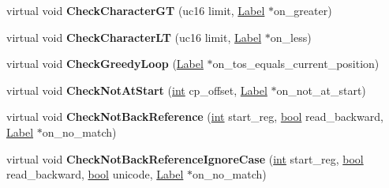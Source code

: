 \begin{DoxyCompactItemize}
\item 
\mbox{\label{classv8_1_1internal_1_1RegExpMacroAssemblerMIPS_a8125957e75e4d4149e916f9a2e1fb925}} 
virtual void {\bfseries Check\+Character\+GT} (uc16 limit, \mbox{\hyperlink{classv8_1_1internal_1_1Label}{Label}} $\ast$on\+\_\+greater)
\item 
\mbox{\label{classv8_1_1internal_1_1RegExpMacroAssemblerMIPS_aeb4a8f3d2314494596589c9b1543faef}} 
virtual void {\bfseries Check\+Character\+LT} (uc16 limit, \mbox{\hyperlink{classv8_1_1internal_1_1Label}{Label}} $\ast$on\+\_\+less)
\item 
\mbox{\label{classv8_1_1internal_1_1RegExpMacroAssemblerMIPS_ae3b5ebd2bfaefa19786e18e5103b2881}} 
virtual void {\bfseries Check\+Greedy\+Loop} (\mbox{\hyperlink{classv8_1_1internal_1_1Label}{Label}} $\ast$on\+\_\+tos\+\_\+equals\+\_\+current\+\_\+position)
\item 
\mbox{\label{classv8_1_1internal_1_1RegExpMacroAssemblerMIPS_aca545a4b5e0b1b8cf0cc2fd6778eb8f1}} 
virtual void {\bfseries Check\+Not\+At\+Start} (\mbox{\hyperlink{classint}{int}} cp\+\_\+offset, \mbox{\hyperlink{classv8_1_1internal_1_1Label}{Label}} $\ast$on\+\_\+not\+\_\+at\+\_\+start)
\item 
\mbox{\label{classv8_1_1internal_1_1RegExpMacroAssemblerMIPS_af33344a5d113a2f1318f2549554fdaca}} 
virtual void {\bfseries Check\+Not\+Back\+Reference} (\mbox{\hyperlink{classint}{int}} start\+\_\+reg, \mbox{\hyperlink{classbool}{bool}} read\+\_\+backward, \mbox{\hyperlink{classv8_1_1internal_1_1Label}{Label}} $\ast$on\+\_\+no\+\_\+match)
\item 
\mbox{\label{classv8_1_1internal_1_1RegExpMacroAssemblerMIPS_a797e74e54cda0b9368dbe36c8f9bb704}} 
virtual void {\bfseries Check\+Not\+Back\+Reference\+Ignore\+Case} (\mbox{\hyperlink{classint}{int}} start\+\_\+reg, \mbox{\hyperlink{classbool}{bool}} read\+\_\+backward, \mbox{\hyperlink{classbool}{bool}} unicode, \mbox{\hyperlink{classv8_1_1internal_1_1Label}{Label}} $\ast$on\+\_\+no\+\_\+match)

\end{DoxyCompactItemize}

